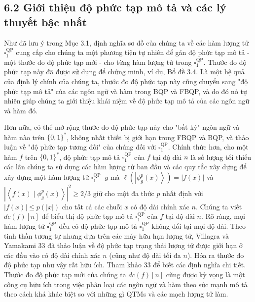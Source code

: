 \documentclass[10pt]{article}
\begin{document}
\subsection*{6.2 Giới thiệu độ phức tạp mô tả và các lý thuyết bậc nhất}
Như đã lưu ý trong Mục 3.1, định nghĩa sơ đồ của chúng ta về các hàm lượng tử $\square_{1}^{\mathrm{QP}}$ cung cấp cho chúng ta một phương tiện tự nhiên để gán độ phức tạp mô tả - một thước đo độ phức tạp mới - cho từng hàm lượng tử trong $\square_{1}^{\mathrm{QP}}$. Thước đo độ phức tạp này đã được sử dụng để chứng minh, ví dụ, Bổ đề 3.4. Là một hệ quả của định lý chính của chúng ta, thước đo độ phức tạp này cũng chuyển sang "độ phức tạp mô tả" của các ngôn ngữ và hàm trong BQP và FBQP, và do đó nó tự nhiên giúp chúng ta giới thiệu khái niệm về độ phức tạp mô tả của các ngôn ngữ và hàm đó.

Hơn nữa, có thể mở rộng thước đo độ phức tạp này cho "bất kỳ" ngôn ngữ và hàm nào trên $\{0,1\}^{*}$, không nhất thiết bị giới hạn trong FBQP và BQP, và thảo luận về "độ phức tạp tương đối" của chúng đối với $\square_{1}^{\mathrm{QP}}$. Chính thức hơn, cho một hàm $f$ trên $\{0,1\}^{*}$, độ phức tạp mô tả $\square_{1}^{\mathrm{QP}}$ của $f$ tại độ dài $n$ là số lượng tối thiểu các lần chúng ta sử dụng các hàm lượng tử ban đầu và các quy tắc xây dựng để xây dựng một hàm lượng tử $\square_{1}^{\text {QP }}$ $g$ mà $\ell\left(\left|\phi_{g}^{p}(x)\right\rangle\right)=|f(x)|$ và $\left|\left\langle f(x) \mid \phi_{g}^{p}(x)\right\rangle\right|^{2} \geq 2 / 3$ giữ cho một đa thức $p$ nhất định với $|f(x)| \leq p(|x|)$ cho tất cả các chuỗi $x$ có độ dài chính xác $n$. Chúng ta viết $d c(f)[n]$ để biểu thị độ phức tạp mô tả $\square_{1}^{\mathrm{QP}}$ của $f$ tại độ dài $n$. Rõ ràng, mọi hàm lượng tử $\square_{1}^{\mathrm{QP}}$ đều có độ phức tạp mô tả $\square_{1}^{\mathrm{QP}}$ không đổi tại mọi độ dài. Theo tinh thần tương tự nhưng dựa trên các máy hữu hạn lượng tử, Villagra và Yamakami 33 đã thảo luận về độ phức tạp trạng thái lượng tử được giới hạn ở các đầu vào có độ dài chính xác $n$ (cũng như độ dài tối đa $n$). Hóa ra thước đo độ phức tạp như vậy rất hữu ích. Tham khảo 33 để biết các định nghĩa chi tiết. Thước đo độ phức tạp mới của chúng ta $d c(f)[n]$ cũng được kỳ vọng là một công cụ hữu ích trong việc phân loại các ngôn ngữ và hàm theo sức mạnh mô tả theo cách khá khác biệt so với những gì QTMs và các mạch lượng tử làm.
\end{document}
